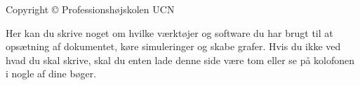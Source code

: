 \thispagestyle{empty}
{\small
\strut\vfill %
\noindent Copyright \copyright{} Professionshøjskolen UCN \the\year\par
\vspace{0.2cm}
\noindent
Her kan du skrive noget om hvilke værktøjer og software du har brugt til at opsætning af dokumentet, køre simuleringer og skabe grafer. Hvis du ikke ved hvad du skal skrive, skal du enten lade denne side være tom eller se på kolofonen i nogle af dine bøger.
}
\clearpage

